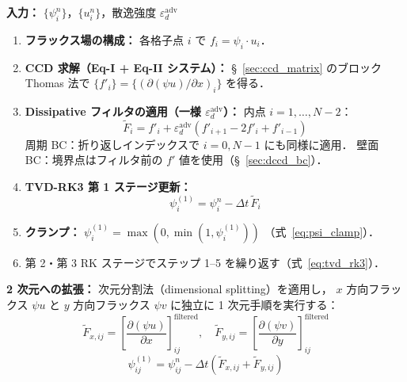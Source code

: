 \begin{tcolorbox}[algbox, title={Dissipative CCD による CLS 移流アルゴリズム（1D)}]
\label{alg:dccd_adv}

\textbf{入力：} $\{\psi_i^n\}$，$\{u_i^n\}$，散逸強度 $\varepsilon_d^{\mathrm{adv}}$

\begin{enumerate}
  \item \textbf{フラックス場の構成：}
        各格子点 $i$ で $f_i = \psi_i \cdot u_i$．

  \item \textbf{CCD 求解（Eq-I + Eq-II システム）：}
        §~\ref{sec:ccd_matrix} のブロック Thomas 法で
        $\{f'_i\} = \{(\partial(\psi u)/\partial x)_i\}$ を得る．

  \item \textbf{Dissipative フィルタの適用（一様 $\varepsilon_d^{\mathrm{adv}}$）：}
        内点 $i = 1,\ldots,N-2$：
        \[
          \tilde{F}_i = f'_i + \varepsilon_d^{\mathrm{adv}}\!\left(f'_{i+1} - 2f'_i + f'_{i-1}\right)
        \]
        周期 BC：折り返しインデックスで $i=0,N-1$ にも同様に適用．
        壁面 BC：境界点はフィルタ前の $f'$ 値を使用（§~\ref{sec:dccd_bc}）．

  \item \textbf{TVD-RK3 第 1 ステージ更新：}
        \[
          \psi_i^{(1)} = \psi_i^n - \Delta t\,\tilde{F}_i
        \]

  \item \textbf{クランプ：} $\psi_i^{(1)} = \max(0,\min(1,\psi_i^{(1)}))$ （式~\eqref{eq:psi_clamp}）．

  \item 第 2・第 3 RK ステージでステップ 1--5 を繰り返す（式~\eqref{eq:tvd_rk3}）．
\end{enumerate}

\textbf{2 次元への拡張：} 次元分割法（dimensional splitting）を適用し，
$x$ 方向フラックス $\psi u$ と $y$ 方向フラックス $\psi v$ に独立に
1 次元手順を実行する：
\[
  \tilde{F}_{x,ij} = \left[\frac{\partial(\psi u)}{\partial x}\right]_{ij}^{\text{filtered}},
  \quad
  \tilde{F}_{y,ij} = \left[\frac{\partial(\psi v)}{\partial y}\right]_{ij}^{\text{filtered}}
\]
\[
  \psi_{ij}^{(1)} = \psi_{ij}^n - \Delta t\!\left(\tilde{F}_{x,ij} + \tilde{F}_{y,ij}\right)
\]
\end{tcolorbox}

